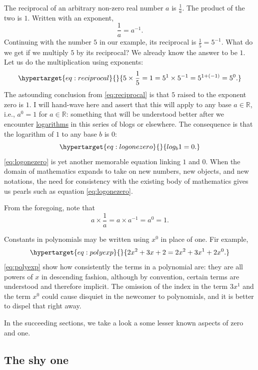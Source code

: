 \documentclass[
  a4paper,
]{article}
\begin{document}
The reciprocal of an arbitrary non-zero real number \(a\) is
\(\frac{1}{a}\). The product of the two is \(1\). Written with an
exponent, \[
\frac{1}{a} = a^{-1}.
\] Continuing with the number \(5\) in our example, its reciprocal is
\(\frac{1}{5} = 5^{-1}\). What do we get if we multiply \(5\) by its
reciprocal? We already know the answer to be \(1\). Let us do the
multiplication using exponents:
\begin{equation}\protect\hypertarget{eq:reciprocal}{}{
5 \times \frac{1}{5} = 1 = 5^{1} \times 5^{-1} = 5^{1+(-1)} = 5^{0}.
}\label{eq:reciprocal}\end{equation} The astounding conclusion from
\cref{eq:reciprocal} is that \(5\) raised to the exponent zero is
\({1}\). I will hand-wave here and assert that this will apply to any
base \(a \in \mathbb{R}\), i.e., \(a^0 = 1\) for \(a \in \mathbb{R}\):
something that will be understood better after we encounter
\href{https://www.britannica.com/science/logarithm}{logarithms} in this
series of blogs or elsewhere. The consequence is that the logarithm of
\(1\) to any base \(b\) is \(0\):
\begin{equation}\protect\hypertarget{eq:logonezero}{}{
log_{b}1 = 0.
}\label{eq:logonezero}\end{equation} \cref{eq:logonezero} is yet another
memorable equation linking \(1\) and \(0\). When the domain of
mathematics expands to take on new numbers, new objects, and new
notations, the need for consistency with the existing body of
mathematics gives us pearls such as equation \cref{eq:logonezero}.

From the foregoing, note that \[
a \times \frac{1}{a} = a \times a^{-1} = a^0 = 1.
\]

Constants in polynomials may be written using \(x^0\) in place of one.
Fir example, \begin{equation}\protect\hypertarget{eq:polyexp}{}{
2x^2 + 3x + 2 = 2x^2 + 3x^1 + 2x^0.
}\label{eq:polyexp}\end{equation} \cref{eq:polyexp} show how
consistently the terms in a polynomial are: they are all powers of \(x\)
in descending fashion, although by convention, certain terms are
understood and therefore implicit. The omission of the index in the term
\(3x^1\) and the term \(x^0\) could cause disquiet in the newcomer to
polynomials, and it is better to dispel that right away.

In the succeeding sections, we take a look a some lesser known aspects
of zero and one.

\hypertarget{the-shy-one}{%
\subsection{The shy one}\label{the-shy-one}}
\end{document}
